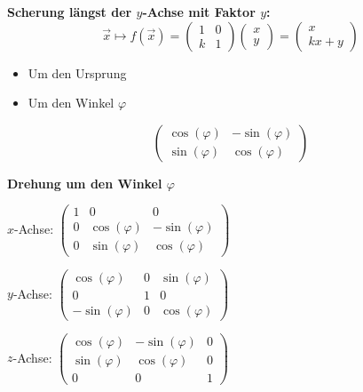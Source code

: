 \textbf{Scherung längst der $y$-Achse mit Faktor $y$:}
\[\vec{x} \mapsto f(\vec{x}) = \left(
\begin{array}{cc}
    1 & 0 \\ k & 1
\end{array}
\right) \left(
\begin{array}{c}
    x \\ y
\end{array}
\right) = \left(
\begin{array}{c}
    x \\ kx + y
\end{array}
\right)\]


\begin{multicols}{2}
    \begin{itemize}
        \item Um den Ursprung
        \item Um den Winkel $\varphi$
    \end{itemize}
    \[\left(
    \begin{array}{cc}
        \cos(\varphi) & -\sin(\varphi) \\
        \sin(\varphi) & \cos(\varphi)
    \end{array}
    \right)\]
\end{multicols}

\textbf{Drehung um den Winkel $\varphi$}

$x$-Achse: $\left(
\begin{array}{ccc}
    1 & 0             & 0              \\
    0 & \cos(\varphi) & -\sin(\varphi) \\
    0 & \sin(\varphi) & \cos(\varphi)
\end{array}
\right)$

$y$-Achse: $\left(
\begin{array}{ccc}
    \cos(\varphi)  & 0 & \sin(\varphi) \\
    0              & 1 & 0             \\
    -\sin(\varphi) & 0 & \cos(\varphi)
\end{array}
\right)$

$z$-Achse: $\left(
\begin{array}{ccc}
    \cos(\varphi) & -\sin(\varphi) & 0 \\
    \sin(\varphi) & \cos(\varphi)  & 0 \\
    0             & 0              & 1
\end{array}
\right)$